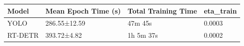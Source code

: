 \begin{tabular}{llll}
\toprule
Model & Mean Epoch Time (s) & Total Training Time & eta_train \\
\midrule
YOLO & 286.55±12.59 & 47m 45s & 0.0003 \\
RT-DETR & 393.72±4.82 & 1h 5m 37s & 0.0002 \\
\bottomrule
\end{tabular}
